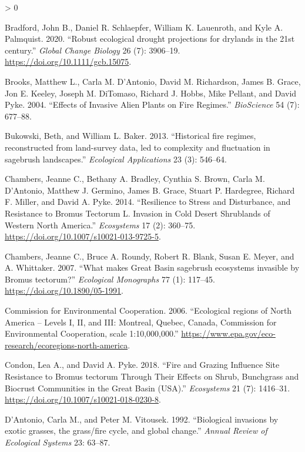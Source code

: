 \documentclass[
  12pt,
]{article}
\newlength{\cslhangindent}
\newenvironment{CSLReferences}[2] %
 {%
  \setlength{\parindent}{0pt}
  \ifodd #1 \everypar{\setlength{\hangindent}{\cslhangindent}}\ignorespaces\fi
  \ifnum #2 > 0
  \setlength{\parskip}{#2\baselineskip}
  \fi
 }%
 {}
\begin{document}
\begin{CSLReferences}{1}{0}
\leavevmode\hypertarget{ref-Bradford2020}{}%
Bradford, John B., Daniel R. Schlaepfer, William K. Lauenroth, and Kyle
A. Palmquist. 2020. {``{Robust ecological drought projections for
drylands in the 21st century}.''} \emph{Global Change Biology} 26 (7):
3906--19. \url{https://doi.org/10.1111/gcb.15075}.

\leavevmode\hypertarget{ref-Brooks2004}{}%
Brooks, Matthew L., Carla M. D'Antonio, David M. Richardson, James B.
Grace, Jon E. Keeley, Joseph M. DiTomaso, Richard J. Hobbs, Mike
Pellant, and David Pyke. 2004. {``{Effects of Invasive Alien Plants on
Fire Regimes}.''} \emph{BioScience} 54 (7): 677--88.

\leavevmode\hypertarget{ref-Bukowski2013}{}%
Bukowski, Beth, and William L. Baker. 2013. {``{Historical fire regimes,
reconstructed from land-survey data, led to complexity and fluctuation
in sagebrush landscapes}.''} \emph{Ecological Applications} 23 (3):
546--64.

\leavevmode\hypertarget{ref-chambers_resilience_2014}{}%
Chambers, Jeanne C., Bethany A. Bradley, Cynthia S. Brown, Carla M.
D'Antonio, Matthew J. Germino, James B. Grace, Stuart P. Hardegree,
Richard F. Miller, and David A. Pyke. 2014. {``Resilience to Stress and
Disturbance, and Resistance to {Bromus} Tectorum {L}. Invasion in Cold
Desert Shrublands of Western {North} {America}.''} \emph{Ecosystems} 17
(2): 360--75. \url{https://doi.org/10.1007/s10021-013-9725-5}.

\leavevmode\hypertarget{ref-Chambers2007}{}%
Chambers, Jeanne C., Bruce A. Roundy, Robert R. Blank, Susan E. Meyer,
and A. Whittaker. 2007. {``{What makes Great Basin sagebrush ecosystems
invasible by Bromus tectorum?}''} \emph{Ecological Monographs} 77 (1):
117--45. \url{https://doi.org/10.1890/05-1991}.

\leavevmode\hypertarget{ref-CEC2006}{}%
Commission for Environmental Cooperation. 2006. {``{Ecological regions
of North America -- Levels I, II, and III: Montreal, Quebec, Canada,
Commission for Environmental Cooperation, scale 1:10,000,000}.''}
\url{https://www.epa.gov/eco-research/ecoregions-north-america}.

\leavevmode\hypertarget{ref-Condon2018}{}%
Condon, Lea A., and David A. Pyke. 2018. {``{Fire and Grazing Influence
Site Resistance to Bromus tectorum Through Their Effects on Shrub,
Bunchgrass and Biocrust Communities in the Great Basin (USA)}.''}
\emph{Ecosystems} 21 (7): 1416--31.
\url{https://doi.org/10.1007/s10021-018-0230-8}.

\leavevmode\hypertarget{ref-DAntonio1992}{}%
D'Antonio, Carla M., and Peter M. Vitousek. 1992. {``{Biological
invasions by exotic grasses, the grass/fire cycle, and global
change}.''} \emph{Annual Review of Ecological Systems} 23: 63--87.


\end{CSLReferences}
\end{document}
